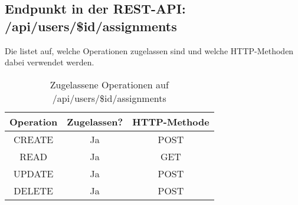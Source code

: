 \subsection{Endpunkt in der REST-API: /api/users/\$id/assignments}
Die  listet auf, welche Operationen zugelassen sind und welche HTTP-Methoden dabei verwendet werden. 

\begin{table}[!htbp]
	\begin{tabular}{|c|c|c|}
		\hline
			\textbf{Operation} & \textbf{Zugelassen?} & \textbf{HTTP-Methode} \\ \hline
			CREATE & Ja & POST \\ \hline 
			READ & Ja & GET \\ \hline
			UPDATE & Ja & POST \\ \hline 
			DELETE & Ja & POST \\ \hline
	\end{tabular}

		\caption{Zugelassene Operationen auf /api/users/\$id/assignments}
		\label{tab:rest:api:users:id:assignments:meth}
\end{table}

